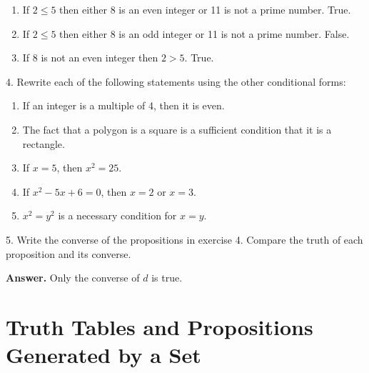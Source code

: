 \documentclass[10pt,]{book}
\theoremstyle{plain}
\theoremstyle{definition}
\theoremstyle{definition}
\theoremstyle{definition}
\theoremstyle{definition}
\begin{document}
\begin{exercisegroup}
\begin{enumerate}[label=\alph*]
\item\hypertarget{li-42}{} If \(2\leqslant 5\) then either 8 is an even integer or 11 is not a prime number. True.%
\item\hypertarget{li-43}{} If \(2\leqslant 5\) then either 8 is an odd integer or 11 is not a prime number. False.%
\item\hypertarget{li-44}{}If 8 is not an even integer then \(2>5\). True.%
\end{enumerate}
%
\item[4.]\hypertarget{exercise-4}{}Rewrite each of the following statements using the other conditional forms:%
\par
\leavevmode%
\begin{enumerate}[label=\alph*]
\item\hypertarget{li-45}{}If an integer is a multiple of 4, then it is even.%
\item\hypertarget{li-46}{}The fact that a polygon is a square is a sufficient condition that it is a rectangle.%
\item\hypertarget{li-47}{}If \(x = 5\), then \(x^2=25\).%
\item\hypertarget{li-48}{}If \(x^2 - 5x + 6 = 0\), then \(x = 2\) or \(x = 3\).%
\item\hypertarget{li-49}{} \(x^2=y^2\) is a necessary condition for \(x = y\). %
\end{enumerate}
%
\par\smallskip
\item[5.]\hypertarget{exercise-5}{}Write the converse of the propositions in exercise 4. Compare the truth of each proposition and its converse.
%
\par\smallskip
\par\smallskip
\noindent\textbf{Answer.}\hypertarget{answer-3}{}\quad
 Only the converse of \(d\) is true.%
\end{exercisegroup}
\par\smallskip\noindent
\typeout{************************************************}
\typeout{************************************************}
\section[Truth Tables and Propositions Generated by a Set]{Truth Tables and Propositions Generated by a Set}\label{c3s2}
\typeout{************************************************}
\typeout{************************************************}
\end{document}
